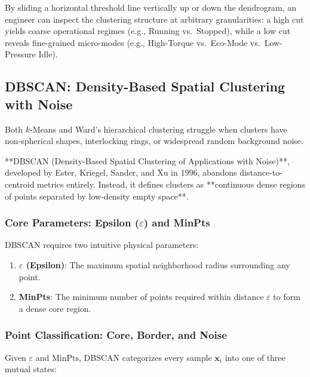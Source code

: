 By sliding a horizontal threshold line vertically up or down the dendrogram, an engineer can inspect the clustering structure at arbitrary granularities: a high cut yields coarse operational regimes (e.g., Running vs.\ Stopped), while a low cut reveals fine-grained micro-modes (e.g., High-Torque vs.\ Eco-Mode vs.\ Low-Pressure Idle).

\subsection{DBSCAN: Density-Based Spatial Clustering with Noise}\label{subsec:dbscan}

Both $k$-Means and Ward's hierarchical clustering struggle when clusters have non-spherical shapes, interlocking rings, or widespread random background noise. 

**DBSCAN (Density-Based Spatial Clustering of Applications with Noise)**, developed by Ester, Kriegel, Sander, and Xu in 1996, abandons distance-to-centroid metrics entirely. Instead, it defines clusters as **continuous dense regions of points separated by low-density empty space**.

\subsubsection{Core Parameters: Epsilon ($\varepsilon$) and MinPts}
DBSCAN requires two intuitive physical parameters:
\begin{enumerate}
    \item \textbf{$\varepsilon$ (Epsilon)}: The maximum spatial neighborhood radius surrounding any point.
    \item \textbf{MinPts}: The minimum number of points required within distance $\varepsilon$ to form a dense core region.
\end{enumerate}

\subsubsection{Point Classification: Core, Border, and Noise}
Given $\varepsilon$ and $\text{MinPts}$, DBSCAN categorizes every sample $\mathbf{x}_i$ into one of three mutual states:

